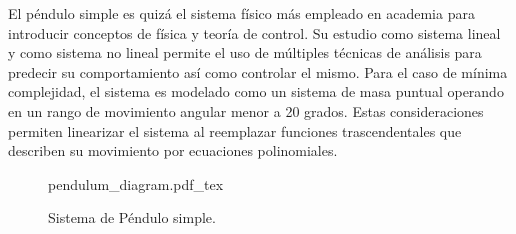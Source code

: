 
El péndulo simple es quizá el sistema físico más empleado en 
academia para introducir conceptos de física y teoría de control.
Su estudio como sistema lineal y como sistema no lineal permite el
uso de múltiples técnicas de análisis para predecir su comportamiento
así como controlar el mismo. Para el caso de mínima complejidad, 
el sistema es modelado como un sistema de masa puntual 
operando en un rango de movimiento angular menor a 20 grados.
Estas consideraciones permiten linearizar el sistema al 
reemplazar funciones trascendentales que describen 
su movimiento por ecuaciones polinomiales.

 
 
 \begin{figure}[ht]
    \centering
    {pendulum_diagram.pdf_tex}
    \caption{Sistema de Péndulo simple.}
    \label{fig: simple pendulum}
\end{figure}
